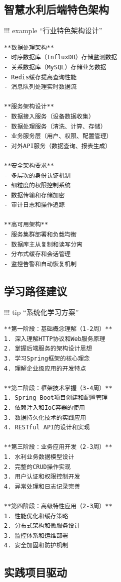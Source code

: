\subsection{智慧水利后端特色架构}\label{ux667aux6167ux6c34ux5229ux540eux7aefux7279ux8272ux67b6ux6784}

!!! example ``行业特色架构设计''

\begin{verbatim}
**数据处理架构**
- 时序数据库（InfluxDB）存储监测数据
- 关系数据库（MySQL）存储业务数据
- Redis缓存提高查询性能
- 消息队列处理实时数据流

**服务架构设计**
- 数据接入服务（设备数据收集）
- 数据处理服务（清洗、计算、存储）
- 业务服务层（用户、权限、配置管理）
- 对外API服务（数据查询、报表生成）

**安全架构要求**
- 多层次的身份认证机制
- 细粒度的权限控制系统
- 数据传输和存储加密
- 审计日志和操作追踪

**高可用架构**
- 服务集群部署和负载均衡
- 数据库主从复制和读写分离
- 分布式缓存和会话管理
- 监控告警和自动恢复机制
\end{verbatim}

\subsection{学习路径建议}\label{ux5b66ux4e60ux8defux5f84ux5efaux8bae}

!!! tip ``系统化学习方案''

\begin{verbatim}
**第一阶段：基础概念理解（1-2周）**
1. 深入理解HTTP协议和Web服务原理
2. 掌握后端服务的架构设计思想
3. 学习Spring框架的核心理念
4. 理解企业级应用的开发特点

**第二阶段：框架技术掌握（3-4周）**
1. Spring Boot项目创建和配置管理
2. 依赖注入和IoC容器的使用
3. 数据持久化技术的实践应用
4. RESTful API的设计和实现

**第三阶段：业务应用开发（2-3周）**
1. 水利业务数据模型设计
2. 完整的CRUD操作实现
3. 用户认证和权限控制开发
4. 异常处理和日志记录完善

**第四阶段：高级特性应用（2-3周）**
1. 性能优化和缓存策略
2. 分布式架构和微服务设计
3. 监控体系和运维部署
4. 安全加固和防护机制
\end{verbatim}

\subsection{实践项目驱动}\label{ux5b9eux8df5ux9879ux76eeux9a71ux52a8}

